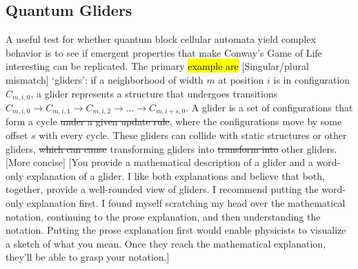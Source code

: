 \documentclass[11pt]{article}
\newcommand{\nicole}[1]{{\color{Green}#1}}
\begin{document}
\begin{multicols}{2}
\subsection*{Quantum Gliders}

A useful test for whether quantum block cellular automata yield complex behavior is to see if emergent properties that make Conway's Game of Life interesting can be replicated. The primary \hl{example are} \nicole{[Singular/plural mismatch]} `gliders': if a neighborhood of width $m$ at position $i$ is in configuration $C_{m,i,0}$, a glider represents a structure that undergoes transitions $C_{m,i,0} \to C_{m,i,1} \to C_{m,i,2} \to ... \to C_{m,i+s, 0}$. A glider is a set of configurations that form a cycle\sout{ under a given update rule}, where the configurations move by some offset $s$ with every cycle. These gliders can collide with static structures or other gliders, \sout{which can cause} \nicole{transforming} gliders \nicole{in}to \sout{transform into} other gliders. \nicole{[More concise]}
\nicole{[You provide a mathematical description of a glider and a word-only explanation of a glider. I like both explanations and believe that both, together, provide a well-rounded view of gliders. I recommend putting the word-only explanation first. I found myself scratching my head over the mathematical notation, continuing to the prose explanation, and then understanding the notation. Putting the prose explanation first would enable physicists to visualize a sketch of what you mean. Once they reach the mathematical explanation, they'll be able to grasp your notation.]}


\end{multicols}
\end{document}
